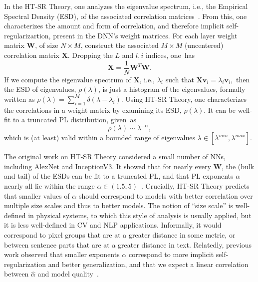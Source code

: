 \documentclass{article}
\begin{document}
In the HT-SR Theory, one analyzes the eigenvalue spectrum, i.e., the Empirical Spectral Density (ESD), of the associated correlation matrices~\cite{MM18_TR,MM19_HTSR_ICML,MM20_SDM}.
From this, one characterizes the amount and form of correlation, and therefore implicit self-regularizartion, present in the DNN's weight matrices.
For each layer weight matrix $\mathbf{W}$, of size $N \times M$, construct the associated $M\times M$ (uncentered) correlation matrix $\mathbf{X}$. 
Dropping the $L$ and $l,i$ indices, one~has
$$
\mathbf{X} = \frac{1}{N}\mathbf{W}^{T}\mathbf{W}.
$$
If we compute the eigenvalue spectrum of $\mathbf{X}$, i.e., $\lambda_i$ such that
$  %
\mathbf{X}\mathbf{v}_{i}=\lambda_{i}\mathbf{v}_{i} , 
$  %
then the ESD of eigenvalues, $\rho(\lambda)$, is just a histogram of the eigenvalues, formally written as
$\rho(\lambda)=\sum\nolimits_{i=1}^{M}\delta(\lambda-\lambda_{i})  .$
Using HT-SR Theory, one characterizes the correlations in a weight matrix by examining its ESD, $\rho(\lambda)$.
It can be well-fit to a truncated PL distribution, given~as
\begin{equation}
\rho(\lambda)\sim\lambda^{-\alpha}  ,
\label{eqn:eigenval_pl}
\end{equation}
which is (at least) valid within a bounded range of eigenvalues $\lambda\in[\lambda^{min},\lambda^{max}]$.  

The original work on HT-SR Theory considered a small number of NNs, including AlexNet and InceptionV3. 
It showed that for nearly every $\mathbf{W}$, the (bulk and tail) of the ESDs can be fit to a truncated PL, and that PL exponents $\alpha$ nearly all lie within the range $\alpha\in(1.5,5)$~\cite{MM18_TR,MM19_HTSR_ICML,MM20_SDM}.
%
%
Crucially, HT-SR Theory predicts that smaller values of $\alpha$ should correspond to models with better correlation over multiple size scales and thus to better models.
The notion of ``size scale'' is well-defined in physical systems, to which this style of analysis is usually applied, but it is less well-defined in CV and NLP applications.
Informally, it would correspond to pixel groups that are at a greater distance in some metric, or between sentence parts that are at a greater distance in text.
Relatedly, previous work observed that smaller exponents $\alpha$ correspond to more implicit self-regularization and better generalization, and that we expect a linear correlation between $\hat{\alpha}$ and model quality~\cite{MM18_TR,MM19_HTSR_ICML,MM20_SDM}.
\end{document}
